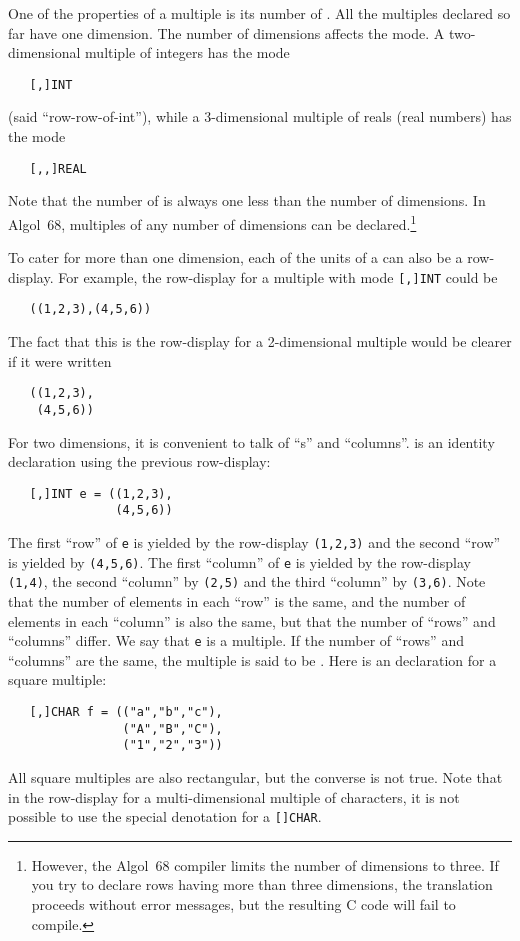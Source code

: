 One of the properties of a multiple is its number of
. All the multiples declared so far have one
dimension. The number of dimensions affects the mode.  A
two-dimensional multiple of integers has the mode
\begin{verbatim}
   [,]INT
\end{verbatim}
\noindent
(said ``row-row-of-int''), while a 3-dimensional multiple of reals
(real numbers) has the mode
\begin{verbatim}
   [,,]REAL
\end{verbatim}
\noindent
Note that the number of  is always one
less than the number of dimensions. In Algol~68, multiples of any
number of dimensions can be declared.\footnote{However, the
\protect{} Algol~68 compiler limits the
number of dimensions to three. If you try to declare rows having more
than three dimensions, the translation proceeds without error
messages, but the resulting C code will fail to compile.}

To cater for more than one dimension, each of the units of a
 can also be a row-display. For example,
the row-display for a multiple with mode \verb|[,]INT| could be
\begin{verbatim}
   ((1,2,3),(4,5,6))
\end{verbatim}
\noindent
The fact that this is the row-display for a 2-dimensional multiple
would be clearer if it were written
\begin{verbatim}
   ((1,2,3),
    (4,5,6))
\end{verbatim}
\noindent
For two dimensions, it is convenient to talk of ``s'' and
``col\-umns''.  is an identity declaration using
the previous row-dis\-play:
\begin{verbatim}
   [,]INT e = ((1,2,3),
               (4,5,6))
\end{verbatim}
\noindent
The first ``row'' of \verb|e| is yielded by the row-display
\verb|(1,2,3)| and the second ``row'' is yielded by \verb|(4,5,6)|.
The first ``column'' of \verb|e| is yielded by the row-display
\verb|(1,4)|, the second ``column'' by \verb|(2,5)| and the third
``column'' by \verb|(3,6)|.  Note that the number of elements in each
``row'' is the same, and the number of elements in each ``column'' is
also the same, but that the number of ``rows'' and ``columns''
differ.  We say that \verb|e| is a
 multiple. If
the number of ``rows'' and ``columns'' are the same, the multiple is
said to be .  Here is an
 declaration for a square
multiple:
\begin{verbatim}
   [,]CHAR f = (("a","b","c"),
                ("A","B","C"),
                ("1","2","3"))
\end{verbatim}
\noindent
All square multiples are also rectangular, but the converse is not
true. Note that in the row-display for a multi-dimensional multiple
of characters, it is not possible to use the special denotation for a
\verb|[]CHAR|.

